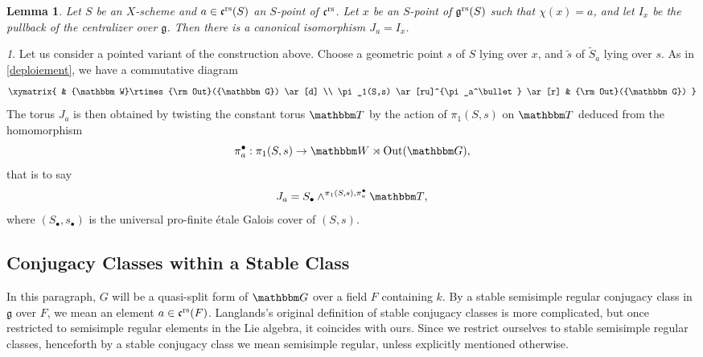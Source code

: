\documentclass[12pt,english]{smfart}
\numberwithin{equation}{subsection}
\newtheorem{lemma}[equation]{Lemma}
\theoremstyle{remark}
\newtheorem{numero}[equation]{}
\newcommand\frakg{{\mathfrak g}}
\newcommand\frakc{{\mathfrak c}}
\newcommand\GG{{\mathbbm G}}
\newcommand\bbW{{\mathbbm W}}
\newcommand\bbT{{\mathbbm T}}
\newcommand\Out{{\rm Out}}
\newcommand\rs{{\rm rs}}
\begin{document}
\begin{lemma}\label{J a}
Let $S$ be an $X$-scheme and $a\in\frakc^\rs(S)$ an $S$-point of $\frakc^\rs$. Let $x$ be an $S$-point of $\frakg^\rs(S)$ such that $\chi(x)=a$, and let $I_x$ be the pullback of the centralizer over $\frakg$. Then there is a canonical isomorphism $J_a=I_x$.
\end{lemma}

\begin{numero}
Let us consider a pointed variant of the construction above. Choose a geometric point $s$ of $S$ lying over $x$, and $\tilde s$ of $\tilde S_a$ lying over $s$. As in \ref{deploiement}, we have a commutative diagram
$$
\xymatrix{
 & \bbW\rtimes \Out(\GG) \ar[d] \\
\pi_1(S,s) \ar[ru]^{\pi_a^\bullet} \ar[r] & \Out(\GG)
}
$$
The torus $J_a$ is then obtained by twisting the constant torus $\bbT$ by the action of $\pi_1(S,s)$ on $\bbT$ deduced from the homomorphism
$$\pi_a^\bullet:\pi_1(S,s)\rightarrow \bbW\rtimes\Out(\GG),$$
that is to say
\begin{equation}\label{pi a J a 2}
J_a=S_\bullet\wedge^{\pi_1(S,s),\pi_a^\bullet}\bbT,
\end{equation}
where $(S_\bullet,s_\bullet)$ is the universal pro-finite \'etale Galois cover of $(S,s)$.
\end{numero}

\subsection{Conjugacy Classes within a Stable Class}

In this paragraph, $G$ will be a quasi-split form of $\GG$ over a field $F$ containing $k$. By a stable semisimple regular conjugacy class in $\frakg$ over $F$, we mean an element $a\in\frakc^\rs(F)$. Langlands's original definition of stable conjugacy classes is more complicated, but once restricted to semisimple regular elements in the Lie algebra, it coincides with ours. Since we restrict ourselves to stable semisimple regular classes, henceforth by a stable conjugacy class we mean semisimple regular, unless explicitly mentioned otherwise.
\end{document}
